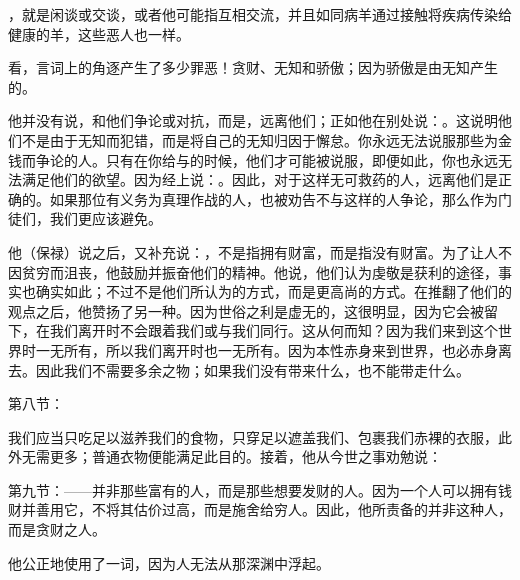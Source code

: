 ，就是闲谈或交谈，或者他可能指互相交流，并且如同病羊通过接触将疾病传染给健康的羊，这些恶人也一样。\par

看，言词上的角逐产生了多少罪恶！贪财、无知和骄傲；因为骄傲是由无知产生的。\par

他并没有说，和他们争论或对抗，而是，远离他们；正如他在别处说：。这说明他们不是由于无知而犯错，而是将自己的无知归因于懈怠。你永远无法说服那些为金钱而争论的人。只有在你给与的时候，他们才可能被说服，即便如此，你也永远无法满足他们的欲望。因为经上说：。因此，对于这样无可救药的人，远离他们是正确的。如果那位有义务为真理作战的人，也被劝告不与这样的人争论，那么作为门徒们，我们更应该避免。\par

他（保禄）说之后，又补充说：，不是指拥有财富，而是指没有财富。为了让人不因贫穷而沮丧，他鼓励并振奋他们的精神。他说，他们认为虔敬是获利的途径，事实也确实如此；不过不是他们所认为的方式，而是更高尚的方式。在推翻了他们的观点之后，他赞扬了另一种。因为世俗之利是虚无的，这很明显，因为它会被留下，在我们离开时不会跟着我们或与我们同行。这从何而知？因为我们来到这个世界时一无所有，所以我们离开时也一无所有。因为本性赤身来到世界，也必赤身离去。因此我们不需要多余之物；如果我们没有带来什么，也不能带走什么。\par

第八节：\par

我们应当只吃足以滋养我们的食物，只穿足以遮盖我们、包裹我们赤裸的衣服，此外无需更多；普通衣物便能满足此目的。接着，他从今世之事劝勉说：\par

第九节：——并非那些富有的人，而是那些想要发财的人。因为一个人可以拥有钱财并善用它，不将其估价过高，而是施舍给穷人。因此，他所责备的并非这种人，而是贪财之人。\par

\par

他公正地使用了一词，因为人无法从那深渊中浮起。\par

